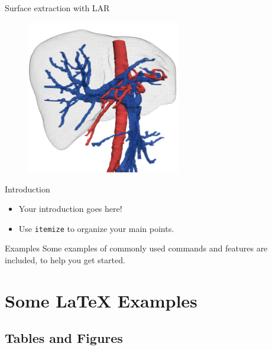 \documentclass[10pt]{beamer}
\begin{document}
\begin{frame}{Surface extraction with LAR}
\begin{figure}
    \centering
            \includegraphics[width=0.6\textwidth]{figs/ircad01_liver_tricolore_01.png}
\end{figure}
    
\end{frame}



\begin{frame}{Introduction}

\begin{itemize}
  \item Your introduction goes here!
  \item Use \texttt{itemize} to organize your main points.
\end{itemize}

\vskip 1cm

\begin{block}{Examples}
Some examples of commonly used commands and features are included, to help you get started.
\end{block}

\end{frame}

\section{Some \LaTeX{} Examples}

\subsection{Tables and Figures}
\end{document}
